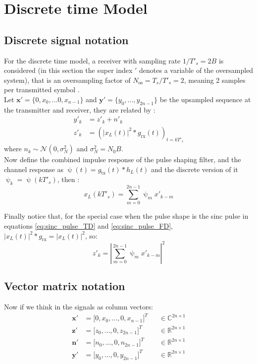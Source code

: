 \section{Discrete time Model}

\subsection{Discrete signal notation}
For the discrete time model, a receiver with sampling rate $1/T'_s=2B$ is considered (in this section the super index $'$ denotes a variable of the oversampled system), that is an oversampling factor of $N_\text{os}=T_s/T'_s=2$, meaning 2 samples per transmitted symbol \cite{Plabst_DD}.\\

Let $\bm x'=\{0,x_0,\dotsc0,x_{n-1}\}$ and $\bm y'=\{y_0,\dotsc,y_{2n-1}\}$ be the upsampled sequence at the transmitter and receiver, they are related by \cite{Plabst_DD}:
\begin{align}
y'_k&=z'_k+n'_k \\
z'_k&=\left(|x_L(t)|^2*g_\text{rx}(t)\right)_{t=kT'_s}
\end{align}
where $n_k\sim\mathcal N(0,\sigma_N^2)$ and $\sigma_N^2=N_0B$.\\

Now define the combined impulse response of the pulse shaping filter, and the channel response as $\uppsi(t)=g_\text{tx}(t)*h_L(t)$ and the discrete version of it $\uppsi_k=\uppsi(kT'_s)$, then \cite{Plabst_DD}:
\begin{equation}
x_L(kT'_s)=\sum_{m=0}^{2n-1}\uppsi_mx'_{k-m}
\end{equation}

Finally notice that, for the special case when the pulse shape is the sinc pulse in equations \ref{eq:sinc_pulse_TD} and \ref{eq:sinc_pulse_FD}, $|x_L(t)|^2*g_\text{rx}=|x_L(t)|^2$, so:
\begin{equation}
z'_k=\left|\sum_{m=0}^{2n-1}\uppsi_mx'_{k-m}\right|^2
\end{equation}


\subsection{Vector matrix notation}

Now if we think in the signals as column vectors:
\begin{align*}
	\bm x'&=\bigl[0,x_0,\dotsc,0,x_{n-1}\bigr]^T &&\in\mathds C^{2n\times1}\\
	\bm z'&=\bigl[z_0,\dotsc,0,z_{2n-1}\bigr]^T &&\in\mathds R^{2n\times1}\\
	\bm n'&=\bigl[n_0,\dotsc,0,n_{2n-1}\bigr]^T &&\in\mathds R^{2n\times1}\\
	\bm y'&=\bigl[y_0,\dotsc,0,y_{2n-1}\bigr]^T &&\in\mathds R^{2n\times1}
\end{align*}

